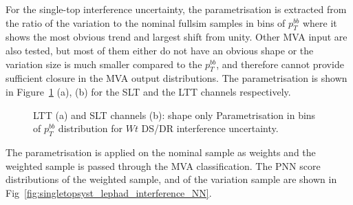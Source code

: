 
For the single-top interference uncertainty, the parametrisation 
is extracted from the ratio of the variation to the nominal fullsim samples
in bins of $p_T^{bb}$ where it shows the most obvious trend and largest shift from unity.
Other MVA input are also tested, but most of them either do not have an obvious shape
or the variation size is much smaller compared to the $p_T^{bb}$, and therefore cannot 
provide sufficient closure in the MVA output distributions. 
The parametrisation is shown in Figure~\ref{fig:singletopsyst_lephad_interference_pTBB} 
(a), (b) for the SLT and the LTT channels respectively.
\begin{figure}
\centering
{}
\caption{LTT (a) and SLT channels (b): shape only Parametrisation in bins of $p_T^{bb}$ distribution for $Wt$ DS/DR interference uncertainty.}
\label{fig:singletopsyst_lephad_interference_pTBB}
\end{figure}
The parametrisation is applied on the nominal sample as weights and the weighted sample
is passed through the MVA classification. 
The PNN score distributions of the weighted sample, and of the variation
sample are shown in Fig~\ref{fig:singletopsyst_lephad_interference_NN}. 
